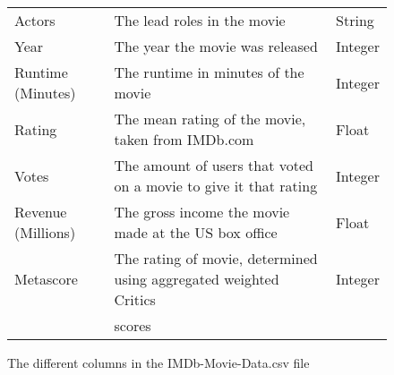 \begin{figure}[h]
\begin{tabular}[width=\linewidth]{lll}
                Actors &                The lead roles in the movie                                                 & String \\
                Year  &                 The year the movie was released                                             & Integer \\
                Runtime (Minutes) &     The runtime in minutes of the movie                                         & Integer \\ 
                Rating   &              The mean rating of the movie, taken from IMDb.com                           & Float \\
                Votes   &               The amount of users that voted on a movie to give it that rating            & Integer \\ 
                Revenue (Millions) &    The gross income the movie made at the US box office                        & Float \\  
                Metascore   &           The rating of movie, determined using aggregated weighted Critics           & Integer \\
                {}          &           scores                                                                      & {} \\         
                \bottomrule
            \end{tabular}
            \caption[short]{The different columns in the IMDb-Movie-Data.csv file}\label{fig-IMDb-Movie-Data-Column-Description}
        \end{figure}

